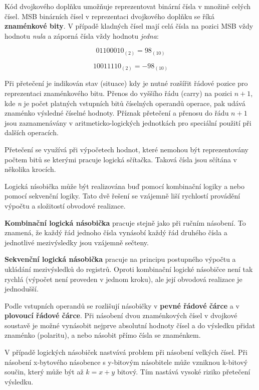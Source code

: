 Kód dvojkového doplňku umožňuje reprezentovat binární čísla v množině celých čísel. MSB binárních čísel v reprezentaci dvojkového doplňku se říká {\bf znaménkové bity}. V případě kladných čísel mají celá čísla na pozici MSB vždy hodnotu {\it nula} a záporná čísla vždy hodnotu {\it jedna}:

$$ 01100010_{(2)} = 98_{(10)} $$

$$ 10011110_{(2)} = -98_{(10)} $$


Při přetečení je indikován stav (situace) kdy je nutné rozšířit řádové pozice pro reprezentaci znaménkového bitu. Přenos do vyššího řádu (carry) na pozici $n+1$, kde {\it n} je počet platných vstupních bitů číselných operandů operace, pak udává znaménko výsledné číselné hodnoty. Příznak přetečení a přenosu do řádu $n+1$ jsou zaznamenávány v aritmeticko-logických jednotkách pro speciální použití při dalších operacích. 

Přetečení se využívá při výpočetech hodnot, které nemohou být reprezentovány počtem bitů se kterými pracuje logická sčítačka. Taková čísla jsou sčítána v několika krocích. 



Logická nísobička může být realizována buď pomocí kombinační logiky a nebo pomocí sekvenční logiky. Tato dvě řešení se vzájemně liší rychlostí provádění výpočtu a složitostí obvodové realizace. 

{\bf Kombinační logická násobička} pracuje stejně jako při ručním násobení. To znamená, že každý řád jednoho čísla vynásobí každý řád druhého čísla a jednotlivé mezivýsledky jsou vzájemně sečteny. 

{\bf Sekvenční logická násobička} pracuje na principu postupného výpočtu a ukládání mezivýsledků do registrů. Oproti kombinační logické násobičce není tak rychlá (výpočet není proveden v jednom kroku), ale její obvodová realizace je jednodušší.

Podle vstupních operandů se rozlišují násobičky v {\bf pevné řádové čárce} a v {\bf plovoucí řádové čárce}. Při násobení dvou znaménkových čísel v dvojkové soustavě je možné vynásobit nejprve absolutní hodnoty čísel a do výsledku přidat znaménko (polaritu), a nebo násobit přímo čísla se znaménkem. 

V případě logických násobiček nastvává problem při násobení velkých čísel. Při násobení x-bytového násobence s y-bitovým násobitele může vzniknou k-bitový součin, který může být až $ k = x + y $ bitový. Tím nastává vysoké riziko přetečení výsledku. 

